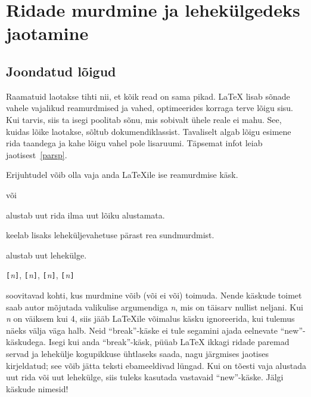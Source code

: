 \section{Ridade murdmine ja lehekülgedeks jaotamine}

\subsection{Joondatud lõigud}

Raamatuid laotakse tihti nii, et kõik read on sama pikad. \LaTeX{} lisab
sõnade vahele vajalikud reamurdmised ja vahed,
optimeerides korraga terve lõigu sisu. Kui tarvis, siis ta
isegi poolitab sõnu, mis sobivalt ühele reale ei mahu. See, kuidas lõike
laotakse, sõltub dokumendiklassist. Tavaliselt algab lõigu esimene rida
taandega ja kahe lõigu vahel pole lisaruumi. Täpsemat infot leiab
jaotisest~\ref{parsp}.

Erijuhtudel võib olla vaja anda \LaTeX ile ise reamurdmise käsk.
\begin{lscommand}
\ci{\bs} või 
\end{lscommand}
\noindent alustab uut rida ilma uut lõiku alustamata.
\begin{lscommand}
\ci{\bs*}
\end{lscommand}
\noindent keelab lisaks leheküljevahetuse pärast rea sundmurdmist.
\begin{lscommand}
\end{lscommand}
\noindent alustab uut lehekülge.

\begin{lscommand}
\verb|[|\emph{n}\verb|]|,
\verb|[|\emph{n}\verb|]|,
\verb|[|\emph{n}\verb|]|,
\verb|[|\emph{n}\verb|]|
\end{lscommand}
\noindent soovitavad kohti, kus murdmine võib (või ei või) toimuda.
Nende käskude toimet saab autor mõjutada valikulise argumendiga
\emph{n}, mis on täisarv nullist neljani. Kui \emph{n} on väiksem kui 4,
siis jääb \LaTeX ile võimalus käsku ignoreerida, kui tulemus näeks välja
väga halb. Neid "`break"'-käske ei tule segamini ajada eelnevate
"`new"'-käskudega. Isegi kui anda "`break"'-käsk, püüab \LaTeX{} ikkagi
ridade paremad servad ja lehekülje kogupikkuse ühtlaseks saada, nagu
järgmises jaotises kirjeldatud; see võib jätta teksti ebameeldivad
lüngad. Kui on tõesti vaja alustada uut rida või uut lehekülge, siis
tuleks kasutada vastavaid "`new"'-käske. Jälgi käskude nimesid!

